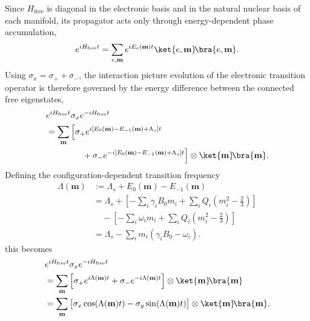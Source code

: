 \documentclass[
  aps,
  pra,
  reprint,            %
  superscriptaddress, %
  amsmath,amssymb,
  notitlepage
]{revtex4-2}
\begin{document}
Since \(H_{\mathrm{free}}\) is diagonal in the electronic basis and in the natural nuclear basis of each manifold, its propagator acts only through energy-dependent phase accumulation,
\[
e^{iH_{\mathrm{free}}t}
=
\sum_{e,\mathbf m}
e^{iE_e(\mathbf m)t}
\ket{e,\mathbf m}\!\bra{e,\mathbf m}.
\]
Using \(\sigma_x=\sigma_++\sigma_-\), the interaction picture evolution of the electronic transition operator is therefore governed by the energy difference between the connected free eigenstates,
\begin{equation}
\begin{aligned}
&e^{iH_{\mathrm{free}}t}
\sigma_x
e^{-iH_{\mathrm{free}}t}
\notag\\
&=
\sum_{\mathbf m}
\Big[
\sigma_+
e^{i[E_0(\mathbf m)-E_{-1}(\mathbf m)+\Lambda_s]t}
\\
&\hspace{1.5cm}
+
\sigma_-
e^{-i[E_0(\mathbf m)-E_{-1}(\mathbf m)+\Lambda_s]t}
\Big]
\otimes
\ket{\mathbf m}\!\bra{\mathbf m}.
\end{aligned}
\label{eq:sigmax_IP_phase}
\end{equation}
Defining the configuration-dependent transition frequency
\begin{equation}
\begin{aligned}
\Lambda(\mathbf m)
&:=
\Lambda_s
+
E_0(\mathbf m)
-
E_{-1}(\mathbf m)
\\
&=
\Lambda_s
+
\left[
-\sum_i\gamma_iB_0m_i
+
\sum_iQ_i\!\left(m_i^2-\tfrac23\right)
\right]
\\
&\quad
-
\left[
-\sum_i\omega_i m_i
+
\sum_iQ_i\!\left(m_i^2-\tfrac23\right)
\right]
\\
&=
\Lambda_s
-
\sum_i m_i(\gamma_iB_0-\omega_i).
\end{aligned}
\label{eq:Lambda_config_general}
\end{equation}
this becomes
\begin{equation}
\begin{aligned}
&e^{iH_{\mathrm{free}}t}
\sigma_x
e^{-iH_{\mathrm{free}}t}
\notag\\
&=
\sum_{\mathbf m}
\left[
\sigma_+ e^{i\Lambda(\mathbf m)t}
+
\sigma_- e^{-i\Lambda(\mathbf m)t}
\right]
\otimes
\ket{\mathbf m}\!\bra{\mathbf m}
\\
&=
\sum_{\mathbf m}
\big[
\sigma_x\cos(\Lambda(\mathbf m)t)
-
\sigma_y\sin(\Lambda(\mathbf m)t)
\big]
\otimes
\ket{\mathbf m}\!\bra{\mathbf m}.
\end{aligned}
\label{eq:sigmax_IP_step}
\end{equation}
\end{document}
